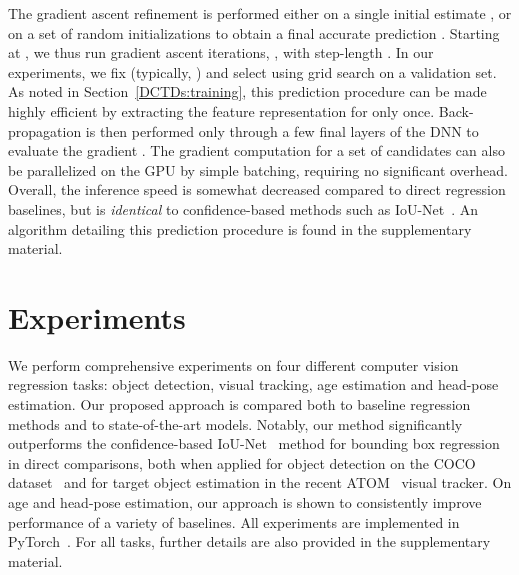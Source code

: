 \documentclass[runningheads]{llncs}
\begin{document}
The gradient ascent refinement is performed either on a single initial estimate , or on a set of random initializations  to obtain a final accurate prediction . Starting at , we thus run  gradient ascent iterations, , with step-length . In our experiments, we fix  (typically, ) and select  using grid search on a validation set. As noted in Section~\ref{DCTDs:training}, this prediction procedure can be made highly efficient by extracting the feature representation for  only once. Back-propagation is then performed only through a few final layers of the DNN to evaluate the gradient . The gradient computation for a set of candidates  can also be parallelized on the GPU by simple batching, requiring no significant overhead. Overall, the inference speed is somewhat decreased compared to direct regression baselines, but is \emph{identical} to confidence-based methods such as IoU-Net~\cite{jiang2018acquisition}. An algorithm detailing this prediction procedure is found in the supplementary material. \section{Experiments}
\label{section: experiments}

We perform comprehensive experiments on four different computer vision regression tasks: object detection, visual tracking, age estimation and head-pose estimation. Our proposed approach is compared both to baseline regression methods and to state-of-the-art models. Notably, our method significantly outperforms the confidence-based IoU-Net~\cite{jiang2018acquisition} method for bounding box regression in direct comparisons, both when applied for object detection on the COCO dataset~\cite{lin2014microsoft} and for target object estimation in the recent ATOM~\cite{danelljan2019atom} visual tracker. On age and head-pose estimation, our approach is shown to consistently improve performance of a variety of baselines. All experiments are implemented in PyTorch~\cite{paszke2019pytorch}. For all tasks, further details are also provided in the supplementary material.
\end{document}
